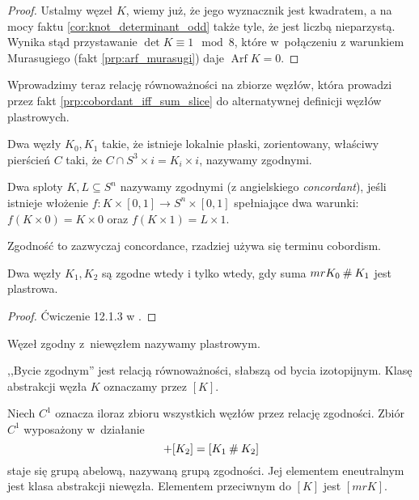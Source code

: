 \begin{proof}
    Ustalmy węzeł $K$, wiemy już, że jego wyznacznik jest kwadratem, a na mocy faktu \ref{cor:knot_determinant_odd} także tyle, że jest liczbą nieparzystą.
    Wynika stąd przystawanie $\det K \equiv 1 \mod 8$, które w~połączeniu z warunkiem Murasugiego (fakt \ref{prp:arf_murasugi}) daje $\operatorname{Arf} K = 0$.
\end{proof}


Wprowadzimy teraz relację równoważności na zbiorze węzłów, która prowadzi przez fakt \ref{prp:cobordant_iff_sum_slice} do alternatywnej definicji węzłów plastrowych.

\begin{definition}[zgodność]
    Dwa węzły $K_0, K_1$ takie, że istnieje lokalnie płaski, zorientowany, właściwy pierścień $C$ taki, że $C \cap S^3 \times i = K_i \times i$, nazywamy zgodnymi.
    
    Dwa sploty $K, L \subseteq S^n$ nazywamy zgodnymi (z angielskiego \emph{concordant}), jeśli istnieje włożenie $f \colon K \times [0,1] \to S^n \times [0,1]$ spełniające dwa warunki: $f(K \times 0) = K \times 0$ oraz $f(K \times 1) = L \times 1$.
\end{definition}

Zgodność to zazwyczaj concordance, rzadziej używa się terminu cobordism.

\begin{proposition}
    \label{prp:cobordant_iff_sum_slice}
    Dwa węzły $K_1, K_2$ są zgodne wtedy i tylko wtedy, gdy suma $mr K_0 \mathbin{\#} K_1$ jest plastrowa.
\end{proposition}

\begin{proof}
    Ćwiczenie 12.1.3 w \cite{kawauchi96}.
\end{proof}

\begin{definition}
    Węzeł zgodny z~niewęzłem nazywamy plastrowym.
\end{definition}

,,Bycie zgodnym'' jest relacją równoważności, słabszą od bycia izotopijnym.
Klasę abstrakcji węzła $K$ oznaczamy przez $[K]$.

\begin{definition}
    Niech $C^1$ oznacza iloraz zbioru wszystkich węzłów przez relację zgodności.
    Zbiór $C^1$ wyposażony w~działanie
    \begin{equation}
        [K_1] + [K_2] = [K_1 \shrap K_2]
    \end{equation}
    staje się grupą abelową, nazywaną grupą zgodności.
    Jej elementem eneutralnym jest klasa abstrakcji niewęzła.
    Elementem przeciwnym do $[K]$ jest $[mr K]$.
\end{definition}

